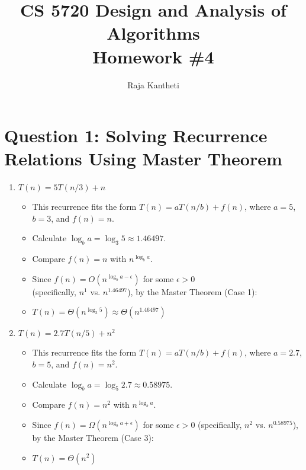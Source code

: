\documentclass{article}
\title{CS 5720 Design and Analysis of Algorithms \\ Homework \#4}
\author{Raja Kantheti}
\begin{document}
\maketitle

\section*{Question 1: Solving Recurrence Relations Using Master Theorem}

\begin{enumerate}[label=(\alph*)]
    \item \( T(n) = 5T(n/3) + n \)
    \begin{itemize}
        \item This recurrence fits the form \( T(n) = aT(n/b) + f(n) \), where \( a = 5 \), \( b = 3 \), and \( f(n) = n \).
        \item Calculate \( \log_b{a} = \log_3{5} \approx 1.46497 \).
        \item Compare \( f(n) = n \) with \( n^{\log_b{a}} \).
        \item Since \( f(n) = O(n^{\log_b{a} - \epsilon}) \) for some \(\epsilon > 0\) \\(specifically, \( n^1 \) vs. \( n^{1.46497} \)), by the Master Theorem (Case 1):
        \item \( T(n) = \Theta(n^{\log_3{5}}) \approx \Theta(n^{1.46497}) \)
    \end{itemize}

    \item \( T(n) = 2.7T(n/5) + n^2 \)
    \begin{itemize}
        \item This recurrence fits the form \( T(n) = aT(n/b) + f(n) \), where \( a = 2.7 \), \( b = 5 \), and \( f(n) = n^2 \).
        \item Calculate \( \log_b{a} = \log_5{2.7} \approx 0.58975 \).
        \item Compare \( f(n) = n^2 \) with \( n^{\log_b{a}} \).
        \item Since \( f(n) = \Omega(n^{\log_b{a} + \epsilon}) \) for some \(\epsilon > 0\) (specifically, \( n^2 \) vs. \( n^{0.58975} \)), by the Master Theorem (Case 3):
        \item \( T(n) = \Theta(n^2) \)
    \end{itemize}


\end{enumerate}
\end{document}
